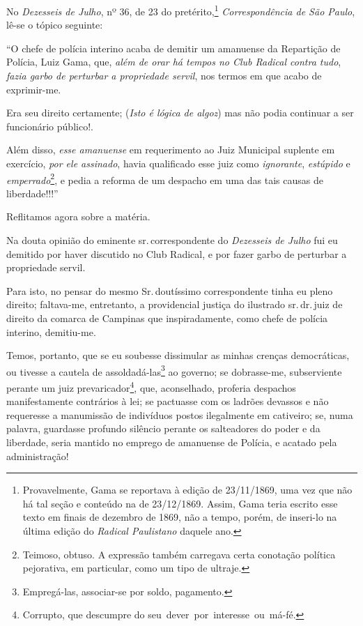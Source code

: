 No \emph{Dezesseis de Julho}, nº 36, de 23 do pretérito,\footnote{
  Provavelmente, Gama se reportava à edição de 23/11/1869, uma vez que
  não há tal seção e conteúdo na de 23/12/1869. Assim, Gama teria
  escrito esse texto em finais de dezembro de 1869, não a tempo, porém,
  de inseri-lo na última edição do \emph{Radical Paulistano} daquele
  ano.} \emph{Correspondência de São Paulo}, lê-se o tópico seguinte:

``O chefe de polícia interino acaba de demitir um amanuense da Repartição
de Polícia, Luiz Gama, que, \emph{além de orar há tempos no Club Radical
contra tudo}, \emph{fazia garbo de perturbar a propriedade servil}, nos
termos em que acabo de exprimir-me.

Era seu direito certamente; (\emph{Isto é lógica de algoz}) mas não
podia continuar a ser funcionário público!.

Além disso, \emph{esse amanuense} em requerimento ao Juiz Municipal
suplente em exercício, \emph{por ele assinado}, havia qualificado esse
juiz como \emph{ignorante}, \emph{estúpido} e
\emph{emperrado}\footnote{ Teimoso, obtuso. A expressão também
  carregava certa conotação política pejorativa, em particular, como um
  tipo de ultraje.}, e pedia a reforma de um despacho em uma das tais 
  causas de liberdade!!!''

Reflitamos agora sobre a matéria.

Na douta opinião do eminente sr.\,correspondente do \emph{Dezesseis de
Julho} fui eu demitido por haver discutido no Club Radical, e por fazer
garbo de perturbar a propriedade servil.

Para isto, no pensar do mesmo Sr.\,doutíssimo correspondente tinha eu
pleno direito; faltava-me, entretanto, a providencial justiça do
ilustrado sr.\,dr.\,juiz de direito da comarca de Campinas que
inspiradamente, como chefe de polícia interino, demitiu-me.

Temos, portanto, que se eu soubesse dissimular as minhas crenças
democráticas, ou tivesse a cautela de assoldadá-las\footnote{
  Empregá-las, associar-se por soldo, pagamento.} ao governo; se
dobrasse-me, subserviente perante um juiz prevaricador\footnote{
  Corrupto, que descumpre do seu~dever~por~interesse~ou~má-fé.}, que,
aconselhado, proferia despachos manifestamente contrários à lei; se
pactuasse com os ladrões devassos e não requeresse a manumissão de
indivíduos postos ilegalmente em cativeiro; se, numa palavra, guardasse
profundo silêncio perante os salteadores do poder e da liberdade, seria
mantido no emprego de amanuense de Polícia, e acatado pela
administração!

